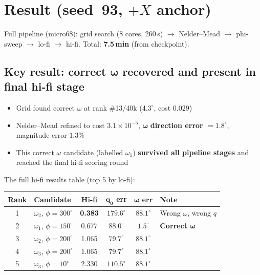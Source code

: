 \documentclass[11pt,a4paper]{article}
\begin{document}
\section{Result (seed~93, $+X$ anchor)}

Full pipeline (micro68): grid search (8 cores, 260\,s) $\to$ Nelder--Mead $\to$
phi-sweep $\to$ lo-fi $\to$ hi-fi. Total: \textbf{7.5\,min} (from checkpoint).

\subsection*{Key result: correct $\boldsymbol{\omega}$ recovered and present in final hi-fi stage}

\begin{itemize}[nosep]
  \item Grid found correct $\omega$ at rank \#13/40k ($4.3^\circ$, cost $0.029$)
  \item Nelder--Mead refined to cost $3.1 \times 10^{-5}$,
    $\boldsymbol{\omega}$ \textbf{direction error $= 1.8^\circ$}, magnitude error $1.3\%$
  \item This correct $\omega$ candidate (labelled $\omega_1$) \textbf{survived all pipeline stages}
    and reached the final hi-fi scoring round
\end{itemize}

\noindent The full hi-fi results table (top 5 by lo-fi):

\begin{center}
\begin{tabular}{@{}clcccl@{}}
\toprule
\textbf{Rank} & \textbf{Candidate} & \textbf{Hi-fi} & $\boldsymbol{q_0}$ \textbf{err} & $\boldsymbol{\omega}$ \textbf{err} & \textbf{Note} \\
\midrule
1 & $\omega_2$, $\phi{=}300^\circ$ & \textbf{0.383} & $179.6^\circ$ & $88.1^\circ$ & Wrong $\omega$, wrong $q$ \\
\rowcolor{green!15}
2 & $\omega_1$, $\phi{=}150^\circ$ & 0.677 & $88.0^\circ$ & $1.5^\circ$ & \textbf{Correct $\boldsymbol{\omega}$} \\
3 & $\omega_2$, $\phi{=}200^\circ$ & 1.065 & $79.7^\circ$ & $88.1^\circ$ & \\
4 & $\omega_3$, $\phi{=}200^\circ$ & 1.065 & $79.7^\circ$ & $88.1^\circ$ & \\
5 & $\omega_3$, $\phi{=}10^\circ$ & 2.330 & $110.5^\circ$ & $88.1^\circ$ & \\
\bottomrule
\end{tabular}
\end{center}
\end{document}
